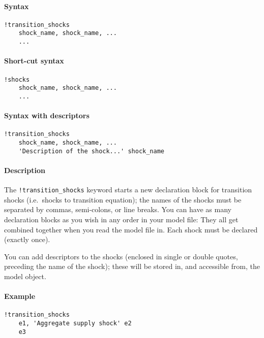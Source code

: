 


	\paragraph{Syntax}

\begin{verbatim}
!transition_shocks
    shock_name, shock_name, ...
    ...
\end{verbatim}

\paragraph{Short-cut syntax}

\begin{verbatim}
!shocks
    shock_name, shock_name, ...
    ...
\end{verbatim}

\paragraph{Syntax with descriptors}

\begin{verbatim}
!transition_shocks
    shock_name, shock_name, ...
    'Description of the shock...' shock_name
\end{verbatim}

\paragraph{Description}

The \texttt{!transition\_shocks} keyword starts a new declaration block
for transition shocks (i.e.~shocks to transition equation); the names of
the shocks must be separated by commas, semi-colons, or line breaks. You
can have as many declaration blocks as you wish in any order in your
model file: They all get combined together when you read the model file
in. Each shock must be declared (exactly once).

You can add descriptors to the shocks (enclosed in single or double
quotes, preceding the name of the shock); these will be stored in, and
accessible from, the model object.

\paragraph{Example}

\begin{verbatim}
!transition_shocks
    e1, 'Aggregate supply shock' e2
    e3
\end{verbatim}


